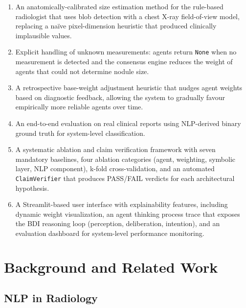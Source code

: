 \documentclass[12pt]{article}
\begin{document}
\begin{enumerate}
    \item An anatomically-calibrated size estimation method for the rule-based radiologist that uses blob detection with a chest X-ray field-of-view model, replacing a na\"ive pixel-dimension heuristic that produced clinically implausible values.
    \item Explicit handling of unknown measurements: agents return \texttt{None} when no measurement is detected and the consensus engine reduces the weight of agents that could not determine nodule size.
    \item A retrospective base-weight adjustment heuristic that nudges agent weights based on diagnostic feedback, allowing the system to gradually favour empirically more reliable agents over time.
    \item An end-to-end evaluation on real clinical reports using NLP-derived binary ground truth for system-level classification.
    \item A systematic ablation and claim verification framework with seven mandatory baselines, four ablation categories (agent, weighting, symbolic layer, NLP component), k-fold cross-validation, and an automated \texttt{ClaimVerifier} that produces PASS/FAIL verdicts for each architectural hypothesis.
    \item A Streamlit-based user interface with explainability features, including dynamic weight visualization, an agent thinking process trace that exposes the BDI reasoning loop (perception, deliberation, intention), and an evaluation dashboard for system-level performance monitoring.
\end{enumerate}


\section{Background and Related Work}
\label{sec:background}

\subsection{NLP in Radiology}
\label{subsec:nlp-radiology}
\end{document}
